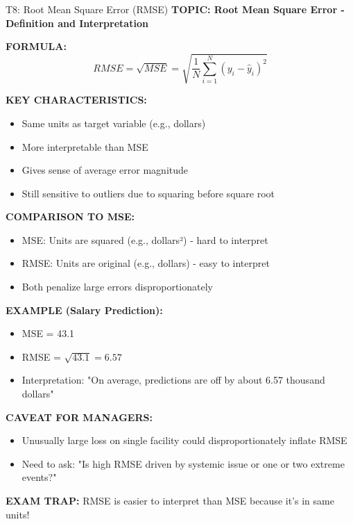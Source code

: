 \documentclass[8pt]{beamer}
\begin{document}
	\begin{frame}{T8: Root Mean Square Error (RMSE)}
		\fontsize{6.5}{7.5}\selectfont
		\textbf{TOPIC: Root Mean Square Error - Definition and Interpretation}
		
		\vspace{0.1cm}
		\textbf{FORMULA:}
		\[
		RMSE = \sqrt{MSE} = \sqrt{\frac{1}{N}\sum_{i=1}^N (y_i - \hat{y}_i)^2}
		\]
		
		\vspace{0.1cm}
		\textbf{KEY CHARACTERISTICS:}
		\begin{itemize}
			\item Same units as target variable (e.g., dollars)
			\item More interpretable than MSE
			\item Gives sense of average error magnitude
			\item Still sensitive to outliers due to squaring before square root
		\end{itemize}
		
		\vspace{0.1cm}
		\textbf{COMPARISON TO MSE:}
		\begin{itemize}
			\item MSE: Units are squared (e.g., dollars²) - hard to interpret
			\item RMSE: Units are original (e.g., dollars) - easy to interpret
			\item Both penalize large errors disproportionately
		\end{itemize}
		
		\vspace{0.1cm}
		\textbf{EXAMPLE (Salary Prediction):}
		\begin{itemize}
			\item MSE = 43.1
			\item RMSE = $\sqrt{43.1} = 6.57$
			\item Interpretation: "On average, predictions are off by about 6.57 thousand dollars"
		\end{itemize}
		
		\vspace{0.1cm}
		\textbf{CAVEAT FOR MANAGERS:}
		\begin{itemize}
			\item Unusually large loss on single facility could disproportionately inflate RMSE
			\item Need to ask: "Is high RMSE driven by systemic issue or one or two extreme events?"
		\end{itemize}
		
		\textcolor{myred}{\textbf{EXAM TRAP:}} RMSE is \textcolor{myblue}{easier to interpret} than MSE because it's in same units!
	\end{frame}
	
\end{document}
